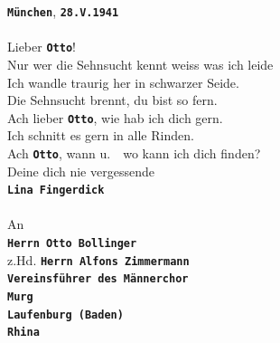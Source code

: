 \documentclass[12pt, a4paper, ngerman, bidi=default]{article}
\begin{document}
\begingroup
\begin{figure}[htbp]
\begin{tcolorbox}[colback=oldLetter, colframe=black, sharp corners, width=\textwidth]
\textbf{\colorbox{place}{\texttt{München}}}, \textbf{\colorbox{date}{\texttt{28.V.1941}}} \\
\\
Lieber \textbf{\colorbox{person}{\texttt{Otto}}}!\\
Nur wer die Sehnsucht kennt weiss was ich leide\\
Ich wandle traurig her in schwarzer Seide.\\
Die Sehnsucht brennt, du bist so fern.\\
Ach lieber \textbf{\colorbox{person}{\texttt{Otto}}}, wie hab ich dich gern.\\
Ich schnitt es gern in alle Rinden.\\
Ach \textbf{\colorbox{person}{\texttt{Otto}}}, wann u.\ \ wo kann ich dich finden?\\
Deine dich nie vergessende\\
\textbf{\colorbox{person}{\texttt{Lina Fingerdick}}}\\
\\
An\\
\textbf{\colorbox{person}{\texttt{Herrn Otto Bollinger}}}\\
z.Hd. \textbf{\colorbox{person}{\texttt{Herrn Alfons Zimmermann}}}\\
\textbf{\colorbox{organization}{\texttt{Vereinsführer des Männerchor}}}\\
\textbf{\colorbox{place}{\texttt{Murg}}}\\
\textbf{\colorbox{place}{\texttt{Laufenburg (Baden)}}}\\
\textbf{\colorbox{place}{\texttt{Rhina}}}
\end{tcolorbox}
\end{figure}
\endgroup

\pagecolor{white}
\newpage
\begingroup
\small
\singlespacing%
\printbibliography[
heading=bibintoc,
title={Bibliographie}%
]%
\endgroup
\end{document}
